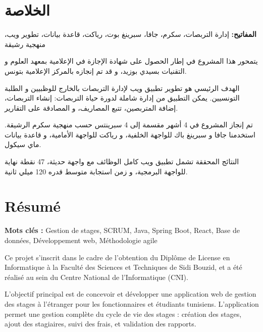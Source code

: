 \documentclass[12pt,a4paper]{report}
\begin{document}

\chapter*{الخلاصة}

\noindent \textbf{المفاتيح:} إدارة التربصات، سكرم، جافا، سبرينغ بوت، رياكت، قاعدة بيانات، تطوير ويب، منهجية رشيقة

\vspace{0.5cm}

يتمحور هذا المشروع في إطار الحصول على شهادة الإجازة في الإعلامية بمعهد العلوم و التقنيات بسيدي بوزيد، و قد تم إنجازه بالمركز الإعلامية بتونس.

الهدف الرئيسي هو تطوير تطبيق ويب لإدارة التربصات بالخارج للوظبيين و الطلبة التونسيين. يمكن التطبيق من إدارة شاملة لدورة حياة التربصات: إنشاء التربصات، إضافة المتربصين، تتبع المصاريف، و المصادقة على التقارير.

تم إنجاز المشروع في 4 أشهر مقسمة إلى 4 سبرينتس حسب منهجية سكرم الرشيقة. استخدمنا جافا و سبرينغ باك للواجهة الخلفية، و رياكت للواجهة الأمامية، و قاعدة بيانات ماي سيكول.

النتائج المحققة تشمل تطبيق ويب كامل الوظائف مع واجهة حديثة، 47 نقطة نهاية للواجهة البرمجية، و زمن استجابة متوسط قدره 120 ميلي ثانية.

\vspace{1cm}

\chapter*{Résumé}

\noindent \textbf{Mots clés :} Gestion de stages, SCRUM, Java, Spring Boot, React, Base de données, Développement web, Méthodologie agile

\vspace{0.5cm}

Ce projet s'inscrit dans le cadre de l'obtention du Diplôme de License en Informatique à la Faculté des Sciences et Techniques de Sidi Bouzid, et a été réalisé au sein du Centre National de l'Informatique (CNI).

L'objectif principal est de concevoir et développer une application web de gestion des stages à l'étranger pour les fonctionnaires et étudiants tunisiens. L'application permet une gestion complète du cycle de vie des stages : création des stages, ajout des stagiaires, suivi des frais, et validation des rapports.
\end{document}
